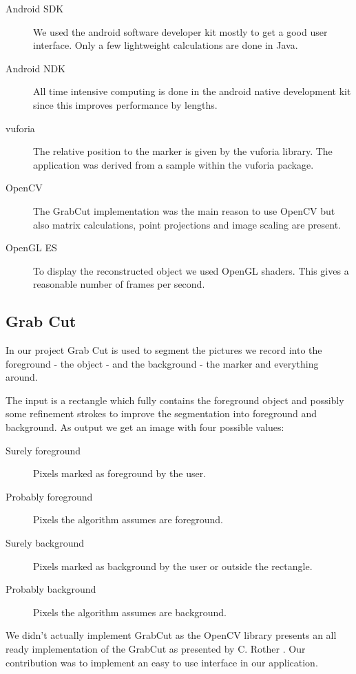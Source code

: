 \documentclass[10pt,twocolumn,letterpaper]{article}
\begin{document}
\begin{description}
	\item[Android SDK] We used the android software developer kit mostly to get a good user interface. Only a few lightweight calculations are done in Java.
	\item[Android NDK] All time intensive computing is done in the android native development kit since this improves performance by lengths.
	\item[vuforia] The relative position to the marker is given by the vuforia library. The application was derived from a sample within the vuforia package.
	\item[OpenCV] The GrabCut implementation was the main reason to use OpenCV but also matrix calculations, point projections and image scaling are present.
	\item[OpenGL ES] To display the reconstructed object we used OpenGL shaders. This gives a reasonable number of frames per second.
\end{description}

\subsection{Grab Cut}

In our project Grab Cut is used to segment the pictures we record into the foreground - the object - and the background - the marker and everything around.

The input is a rectangle which fully contains the foreground object and possibly some refinement strokes to improve the segmentation into foreground and background. As output we get an image with four possible values:

\begin{description}
	\item[Surely foreground] Pixels marked as foreground by the user.
	\item[Probably foreground] Pixels the algorithm assumes are foreground.
	\item[Surely background] Pixels marked as background by the user or outside the rectangle.
	\item[Probably background] Pixels the algorithm assumes are background.
\end{description}

We didn't actually implement GrabCut as the OpenCV library presents an all ready implementation of the GrabCut as presented by C. Rother \etal \cite{Rother}. Our contribution was to implement an easy to use interface in our application.
\end{document}

